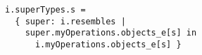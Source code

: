 \lstset{frame=tb, aboveskip=12pt, belowskip=-3pt, breaklines=true, basicstyle=\small\ttfamily, tabsize=2, mathescape=true}
\begin{lstlisting}[caption={bb.als, lines 43-46}, label=alloy:supertype, captionpos=b]
i.superTypes.s =
  { super: i.resembles |
    super.myOperations.objects_e[s] in
      i.myOperations.objects_e[s] }
\end{lstlisting}
